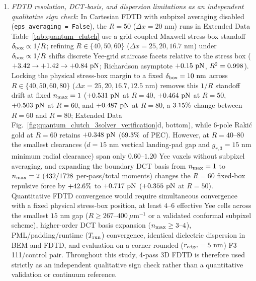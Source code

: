 \documentclass[pdflatex,sn-nature]{sn-jnl}
\DeclareRobustCommand{\roundtwo}[1]{\fpeval{round(#1,2)}}
\DeclareRobustCommand{\roundthree}[1]{\fpeval{round(#1,3)}}
\begin{document}
\begin{enumerate}
    \item \emph{FDTD resolution, DCT-basis, and dispersion limitations as an independent qualitative sign check}: In Cartesian FDTD with subpixel averaging disabled (\texttt{eps\_averaging = False}), the $R=50$ ($\Delta x = 20\text{ nm}$) runs in Extended Data Table~\ref{tab:quantum_clutch} use a grid-coupled Maxwell stress-box standoff $\delta_{\rm box} \propto 1/R$; refining $R \in \{40, 50, 60\}$ ($\Delta x = 25, 20, 16.7\text{ nm}$) under $\delta_{\rm box} \propto 1/R$ shifts discrete Yee-grid staircase facets relative to the stress box ($+\roundtwo{\CantorNtwoHybridrzMeepRfourzeroFZPn} \to +\roundtwo{\CantorNtwoHybridrzMeepRfivezeroFZPn} \to +\roundtwo{\CantorNtwoHybridrzMeepRsixzeroFZPn}\text{ pN}$; Richardson asymptote $+\roundtwo{\CantorNtwoHybridrzMeepRichardsonFZPn}\text{ pN}$, $R^2 = \roundthree{\NatureMeepRichardsonRtwoFourpass}$). Locking the physical stress-box margin to a fixed $\delta_{\rm box} = 10{}\text{ nm}$ across $R \in \{40, 50, 60, 80\}$ ($\Delta x = 25, 20, 16.7, 12.5\text{ nm}$) removes this $1/R$ standoff drift at fixed $n_{\rm max}=1$ ($+\roundthree{\MeepFixedboxRfourzeroFzPn}\text{ pN}$ at $R=40$, $+\roundthree{\MeepFixedboxRfivezeroFzPn}\text{ pN}$ at $R=50$, $+\roundthree{\MeepFixedboxRsixzeroFzPn}\text{ pN}$ at $R=60$, and $+\roundthree{\MeepFixedboxReightzeroFzPn}\text{ pN}$ at $R=80$, a $\roundtwo{\MeepFixedboxRsixzeroToReightzeroDriftPct}\%$ change between $R=60$ and $R=80$; Extended Data Fig.~\ref{fig:quantum_clutch_3solver_verification}d, bottom), while 6-pole Raki\'c gold at $R=60$ retains $+\roundthree{\MeepFixedboxRsixzeroGoldFzPn}\text{ pN}$ ($69.3{}\%$ of PEC). However, at $R=40\text{--}80$ the smallest clearances ($d=15\text{ nm}$ vertical landing-pad gap and $g_{r,3}=15\text{ nm}$ minimum radial clearance) span only $0.60\text{--}1.20$ Yee voxels without subpixel averaging, and expanding the boundary DCT basis from $n_{\rm max}=1$ to $n_{\rm max}=2$ ($432{}/1728{}$ per-pass/total moments) changes the $R=60$ fixed-box repulsive force by $+42.6{}\%$ to $+\roundthree{\MeepFixedboxRsixzeroNmaxtwoFzPn}\text{ pN}$ ($+\roundthree{\MeepFixedboxRfivezeroNmaxtwoFzPn}\text{ pN}$ at $R=50$). Quantitative FDTD convergence would require simultaneous convergence with a fixed physical stress-box position, at least $4\text{--}6$ effective Yee cells across the smallest $15\text{ nm}$ gap ($R \ge 267\text{--}400\ \mu\text{m}^{-1}$ or a validated conformal subpixel scheme), higher-order DCT basis expansion ($n_{\rm max} \ge 3\text{--}4$), PML/padding/runtime ($T_{\rm run}$) convergence, identical dielectric dispersion in BEM and FDTD, and evaluation on a corner-rounded ($r_{\rm edge}=5\text{ nm}$) F3-111/control pair. Throughout this study, 4-pass 3D FDTD is therefore used strictly as an independent qualitative sign check rather than a quantitative validation or continuum reference.
\end{enumerate}
\end{document}
